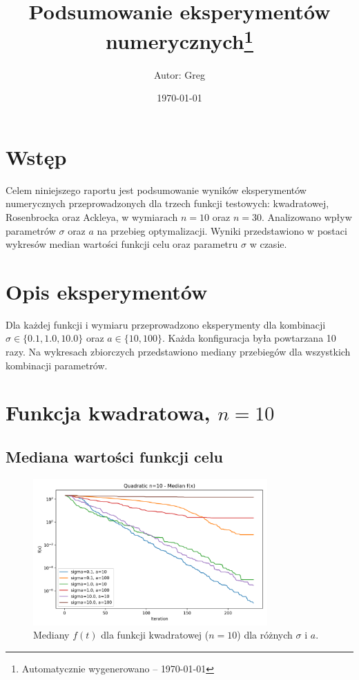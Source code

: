 \documentclass[a4paper,12pt]{article}
\title{Podsumowanie eksperymentów numerycznych\thanks{Automatycznie wygenerowano -- {\today}}}
\author{Autor: Greg}
\date{\today}
\begin{document}
\maketitle
\tableofcontents
\newpage

\section{Wstęp}
Celem niniejszego raportu jest podsumowanie wyników eksperymentów numerycznych przeprowadzonych dla trzech funkcji testowych: kwadratowej, Rosenbrocka oraz Ackleya, w wymiarach $n=10$ oraz $n=30$. Analizowano wpływ parametrów $\sigma$ oraz $a$ na przebieg optymalizacji. Wyniki przedstawiono w postaci wykresów median wartości funkcji celu oraz parametru $\sigma$ w czasie.

\section{Opis eksperymentów}
Dla każdej funkcji i wymiaru przeprowadzono eksperymenty dla kombinacji $\sigma \in \{0.1, 1.0, 10.0\}$ oraz $a \in \{10, 100\}$. Każda konfiguracja była powtarzana 10 razy. Na wykresach zbiorczych przedstawiono mediany przebiegów dla wszystkich kombinacji parametrów.

\section{Funkcja kwadratowa, $n=10$}
\subsection{Mediana wartości funkcji celu}
\begin{figure}[H]
    \centering
    \includegraphics[width=0.8\textwidth]{charts/Quadratic_n10_all_medians.png}
    \caption{Mediany $f(t)$ dla funkcji kwadratowej ($n=10$) dla różnych $\sigma$ i $a$.}
\end{figure}
\end{document}
